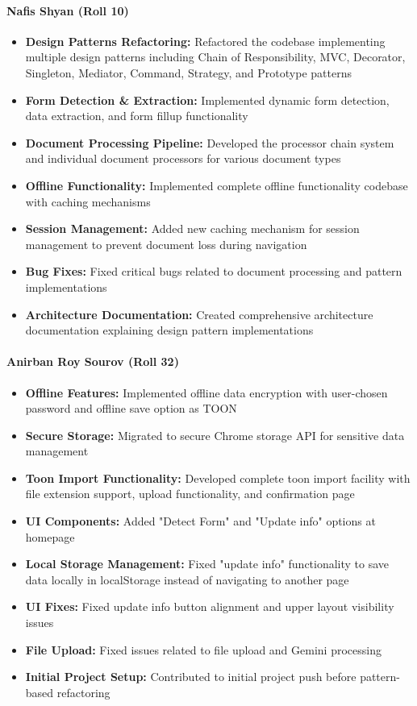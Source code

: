 \documentclass[11pt, a4paper]{article}
\theoremstyle{plain}
\theoremstyle{definition}
\begin{document}
\paragraph{Nafis Shyan (Roll 10)}
\begin{itemize}
    \item \textbf{Design Patterns Refactoring:} Refactored the codebase implementing multiple design patterns including Chain of Responsibility, MVC, Decorator, Singleton, Mediator, Command, Strategy, and Prototype patterns
    \item \textbf{Form Detection \& Extraction:} Implemented dynamic form detection, data extraction, and form fillup functionality
    \item \textbf{Document Processing Pipeline:} Developed the processor chain system and individual document processors for various document types
    \item \textbf{Offline Functionality:} Implemented complete offline functionality codebase with caching mechanisms
    \item \textbf{Session Management:} Added new caching mechanism for session management to prevent document loss during navigation
    \item \textbf{Bug Fixes:} Fixed critical bugs related to document processing and pattern implementations
    \item \textbf{Architecture Documentation:} Created comprehensive architecture documentation explaining design pattern implementations
\end{itemize}

\paragraph{Anirban Roy Sourov (Roll 32)}
\begin{itemize}
    \item \textbf{Offline Features:} Implemented offline data encryption with user-chosen password and offline save option as TOON
    \item \textbf{Secure Storage:} Migrated to secure Chrome storage API for sensitive data management
    \item \textbf{Toon Import Functionality:} Developed complete toon import facility with file extension support, upload functionality, and confirmation page
    \item \textbf{UI Components:} Added "Detect Form" and "Update info" options at homepage
    \item \textbf{Local Storage Management:} Fixed "update info" functionality to save data locally in localStorage instead of navigating to another page
    \item \textbf{UI Fixes:} Fixed update info button alignment and upper layout visibility issues
    \item \textbf{File Upload:} Fixed issues related to file upload and Gemini processing
    \item \textbf{Initial Project Setup:} Contributed to initial project push before pattern-based refactoring
\end{itemize}
\end{document}
